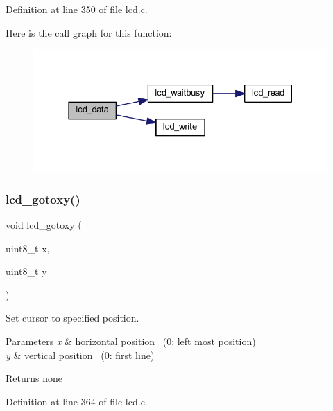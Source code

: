 Definition at line 350 of file lcd.\+c.

Here is the call graph for this function\+:\nopagebreak
\begin{figure}[H]
\begin{center}
\leavevmode
\includegraphics[width=331pt]{group__pfleury__lcd_gad0729d2cba627825a089ca1fff12ba29_cgraph}
\end{center}
\end{figure}
\mbox{\label{group__pfleury__lcd_gadbf47a5efdf02367ded1ebf8f9edb5fe}} 
\subsubsection{\texorpdfstring{lcd\_gotoxy()}{lcd\_gotoxy()}}
{\footnotesize\ttfamily void lcd\+\_\+gotoxy (\begin{DoxyParamCaption}\item[{uint8\+\_\+t}]{x,  }\item[{uint8\+\_\+t}]{y }\end{DoxyParamCaption})}



Set cursor to specified position. 


\begin{DoxyParams}{Parameters}
{\em x} & horizontal position~\newline
 (0\+: left most position) \\
\hline
{\em y} & vertical position~\newline
 (0\+: first line) \\
\hline
\end{DoxyParams}
\begin{DoxyReturn}{Returns}
none 
\end{DoxyReturn}


Definition at line 364 of file lcd.\+c.

